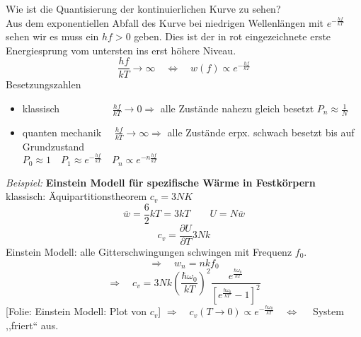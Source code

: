 \documentclass[titlepage,11pt,a4paper,ngerman]{report}
\newcommand{\ol}[1]{\overline{#1}}
\newcommand{\prt}[2]{\frac{\partial #1}{\partial #2}}
\newcommand{\folie}[1]{\color{gray}[Folie: #1]\color{black}}
\begin{document}
\noindent
Wie ist die Quantisierung der kontinuierlichen Kurve zu sehen?\\
Aus dem exponentiellen Abfall des Kurve bei niedrigen Wellenlängen mit $ e^{-\frac{hf}{kT}} $ sehen wir es muss ein $ hf > 0 $ geben. Dies ist der in rot eingezeichnete erste Energiesprung vom untersten ins erst höhere Niveau.
\begin{equation*}
\frac{hf}{kT} \to \infty \quad \Leftrightarrow \quad w(f) \propto e^{-\frac{hf}{kT}}
\end{equation*}
Besetzungszahlen
\begin{itemize}
	\item klassisch $ \qquad \qquad \quad \frac{hf}{kT} \to 0  \Rightarrow $ alle Zustände nahezu gleich besetzt $ P_n \approx \frac{1}{N} $
	\item quanten mechanik $ \ \ \ \, \, \frac{hf}{kT} \to \infty \Rightarrow $ alle Zustände erpx. schwach besetzt bis auf Grundzustand\\
	$ P_0 \approx 1 \quad P_1 \approx e^{-\frac{hf}{kT}} \quad P_n \propto e^{- n \frac{hf}{kT}} $
\end{itemize}
\emph{Beispiel:} \textbf{Einstein Modell für spezifische Wärme in Festkörpern}\\[5pt]
klassisch: Äquipartitionstheorem $ c_v = 3 N K $
\begin{equation*}
\ol{w} = \frac{6}{2} k T = 3 kT \qquad U = N \ol{w}
\end{equation*}
\begin{equation*}
c_v = \prt{U}{T} 3 N k
\end{equation*}
Einstein Modell: alle Gitterschwingungen schwingen mit Frequenz $ f_0 $.
\begin{equation*}
\Rightarrow \quad w_n = n k f_0
\end{equation*}
\begin{equation*}
\Rightarrow \quad c_v = 3 N k \left(\frac{\hbar \omega_0}{kT}\right)^2 \frac{e^{\frac{\hbar \omega_0}{kT}}}{\left[e^{\frac{\hbar \omega_0}{kT}} - 1\right]^2}
\end{equation*}
\folie{Einstein Modell: Plot  von $ c_v $}
$ \Rightarrow \quad c_v(T \to 0) \propto e^{-\frac{\hbar \omega_0}{kT}} \quad \Leftrightarrow \quad  $ System ,,friert`` aus.




















%
%
\end{document}
